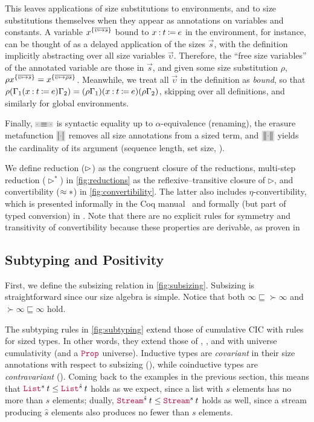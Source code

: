 This leaves applications of size substitutions to environments,
and to size substitutions themselves when they appear as annotations on variables and constants.
A variable $x^{\{\overline{\upsilon \mapsto s}\}}$ bound to $x \mathbin{:} t \mathbin{\coloneqq} e$ in the environment, for instance,
can be thought of as a delayed application of the sizes $\vec{s}$,
with the definition implicitly abstracting over all size variables $\vec{\upsilon}$.
Therefore, the ``free size variables'' of the annotated variable are those in $\vec{s}$,
and given some size substitution $\rho$,
$\rho x^{\{\overline{\upsilon \mapsto s}\}} = x^{\{\overline{\upsilon \mapsto \rho s}\}}$.
Meanwhile, we treat all $\vec{\upsilon}$ in the definition as \emph{bound},
so that $\rho(\Gamma_1 (x \mathbin{:} t \mathbin{\coloneqq} e) \Gamma_2) = (\rho\Gamma_1)(x \mathbin{:} t \mathbin{\coloneqq} e)(\rho\Gamma_2)$,
skipping over all definitions, and similarly for global environments.

Finally, $\new{\ph \equiv \ph}$ is syntactic equality up to $\alpha$-equivalence (renaming),
the erasure metafunction $\new{\erase{\ph}}$ removes all size annotations from a sized term,
and $\new{\norm{\ph}}$ yields the cardinality of its argument (\eg sequence length, set size, \etc).

We define reduction ($\mathrel{\rhd}$) as the congruent closure of the reductions,
multi-step reduction ($\rhd^*$) in \autoref{fig:reductions} as the reflexive--transitive closure of $\rhd$,
and convertibility ($\mathrel{\approx}*$) in \autoref{fig:convertibility}.
The latter also includes $\eta$-convertibility,
which is presented informally in the Coq manual~\citep{coq} and formally (but part of typed conversion) in \citet{conversion}.
Note that there are no explicit rules for symmetry and transitivity of convertibility
because these properties are derivable, as proven in

\subsection{Subtyping and Positivity}\label{subsec:typing:subtyping}



First, we define the subsizing relation in \autoref{fig:subsizing}.
Subsizing is straightforward since our size algebra is simple.
Notice that both $\infty \sqsubseteq \succ{\infty}$ and $\succ{\infty} \sqsubseteq \infty$ hold.



The subtyping rules in \autoref{fig:subtyping} extend those of cumulative CIC with rules for sized \coinductive types.
In other words, they extend those of \CIChat, \CIChatminus, and \CChatomega with universe cumulativity (and a $\Prop$ universe).
Inductive types are \emph{covariant} in their size annotations with respect to subsizing (),
while coinductive types are \emph{contravariant} ().
Coming back to the examples in the previous section, this means that
$\app{\List^{s}}{t} \leq \app{\List^{\hat{s}}}{t}$ holds as we expect,
since a list with $s$ elements has no more than $\hat{s}$ elements;
dually, $\app{\Stream^{\hat{s}}}{t} \leq \app{\Stream^{s}}{t}$ holds as well,
since a stream producing $\hat{s}$ elements also produces no fewer than $s$ elements.

